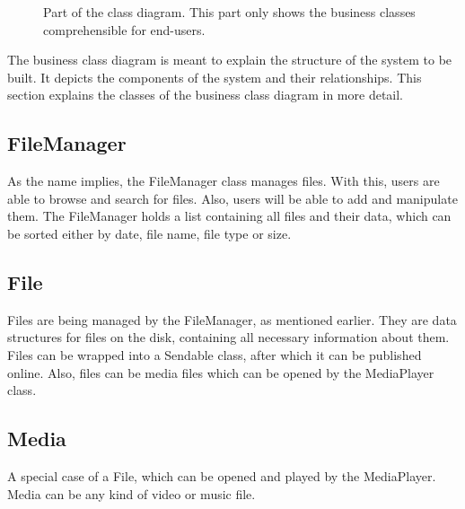 \begin{center}
\begin{figure}[h!]
\caption{Part of the class diagram. This part only shows the business classes comprehensible for end-users.}
\end{figure}
\end{center}
\clearpage

The business class diagram is meant to explain the structure of the system to be built. It depicts the components of the system
and their relationships. This section explains the classes of the business class diagram in more detail.

\subsection{FileManager}
As the name implies, the FileManager class manages files. With this, users are able to browse and search for files.
Also, users will be able to add and manipulate them. The FileManager holds a list containing all files and their data, which can be sorted either
by date, file name, file type or size.

\subsection{File}
Files are being managed by the FileManager, as mentioned earlier. They are data structures for files on the disk, containing all necessary 
information about them. Files can be wrapped into a Sendable class, after which it can be published online. Also, files can be media files which
can be opened by the MediaPlayer class.

\subsection{Media}
A special case of a File, which can be opened and played by the MediaPlayer. Media can be any kind of video or music file.

